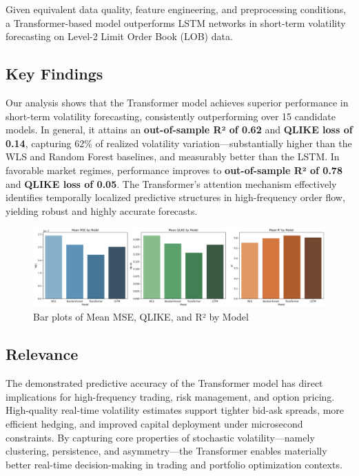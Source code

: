 \documentclass[
  letterpaper,
  DIV=11,
  numbers=noendperiod]{scrartcl}
\begin{document}
Given equivalent data quality, feature engineering, and preprocessing
conditions, a Transformer-based model outperforms LSTM networks in
short-term volatility forecasting on Level-2 Limit Order Book (LOB)
data.

\subsection{Key Findings}\label{key-findings}

Our analysis shows that the Transformer model achieves superior
performance in short-term volatility forecasting, consistently
outperforming over 15 candidate models. In general, it attains an
\textbf{out-of-sample R² of 0.62} and \textbf{QLIKE loss of 0.14},
capturing 62\% of realized volatility variation---substantially higher
than the WLS and Random Forest baselines, and measurably better than the
LSTM. In favorable market regimes, performance improves to
\textbf{out-of-sample R² of 0.78} and \textbf{QLIKE loss of 0.05}. The
Transformer's attention mechanism effectively identifies temporally
localized predictive structures in high-frequency order flow, yielding
robust and highly accurate forecasts.

\begin{figure}[H]

{\centering \includegraphics[width=1\textwidth,height=\textheight]{model_comparison.png}

}

\caption{Bar plots of Mean MSE, QLIKE, and R² by Model}

\end{figure}%

\subsection{Relevance}\label{relevance}

The demonstrated predictive accuracy of the Transformer model has direct
implications for high-frequency trading, risk management, and option
pricing. High-quality real-time volatility estimates support tighter
bid-ask spreads, more efficient hedging, and improved capital deployment
under microsecond constraints. By capturing core properties of
stochastic volatility---namely clustering, persistence, and
asymmetry---the Transformer enables materially better real-time
decision-making in trading and portfolio optimization contexts.
\end{document}
